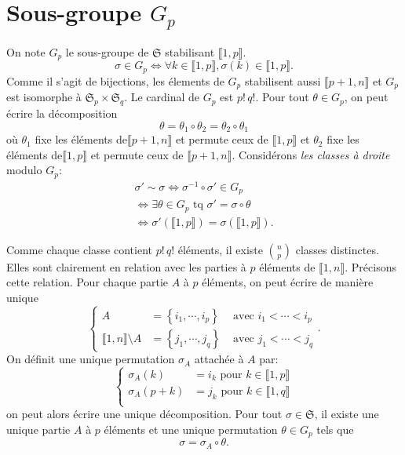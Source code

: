 \section*{Sous-groupe $G_p$}
On note $G_p$ le sous-groupe de $\mathfrak{S}$ stabilisant $\llbracket 1,p \rrbracket$.
\[
 \sigma \in G_p \Leftrightarrow \forall k \in \llbracket 1,p \rrbracket, \sigma(k) \in \llbracket 1,p \rrbracket.
\]
Comme il s'agit de bijections, les élements de $G_p$ stabilisent aussi $\llbracket p+1,n\rrbracket$ et $G_p$ est isomorphe à $\mathfrak{S}_p\times \mathfrak{S}_q$.  Le cardinal de $G_p$ est $p!\, q!$.\newline
Pour tout $\theta \in G_p$, on peut écrire la décomposition
\begin{equation}\label{theta1-2}
 \theta = \theta_1 \circ \theta_2 = \theta_2 \circ \theta_1 
\end{equation}
où $\theta_1$ fixe les éléments de$\llbracket p+1, n\rrbracket$ et permute ceux de $\llbracket 1,p\rrbracket$ et $\theta_2$ fixe les éléments de$\llbracket 1, p\rrbracket$ et permute ceux de $\llbracket p+1,n\rrbracket$.  
Considérons \emph{les classes à droite} modulo $G_p$:
\begin{multline*}
 \sigma' \sim \sigma \Leftrightarrow \sigma^{-1} \circ \sigma' \in G_p \\
 \Leftrightarrow \exists \theta \in G_p \text{ tq } \sigma' = \sigma \circ \theta \\
 \Leftrightarrow \sigma'(\llbracket 1,p \rrbracket) = \sigma(\llbracket 1,p \rrbracket).
\end{multline*}

Comme chaque classe contient $p!\,q!$ éléments, il existe $\binom{n}{p}$ classes distinctes. Elles sont clairement en relation avec les parties à $p$ éléments de $\llbracket 1,n \rrbracket$.\newline
Précisons cette relation. Pour chaque partie $A$ à $p$ éléments, on peut écrire de manière unique
\[
 \left\lbrace 
 \begin{aligned}
  A &= \left\lbrace i_1, \cdots, i_p\right\rbrace &\text{ avec } i_1 < \cdots < i_p \\
  \llbracket 1,n \rrbracket \setminus A &= \left\lbrace j_1, \cdots, j_q\right\rbrace &\text{ avec } j_1 < \cdots < j_q 
 \end{aligned}
 \right. .
\]
On définit une unique permutation $\sigma_A$ attachée à $A$ par:
\[
 \left\lbrace 
 \begin{aligned}
  \sigma_A(k) &= i_k \text{ pour } k\in \llbracket 1,p \rrbracket \\
  \sigma_A(p+k) &= j_k \text{ pour } k\in \llbracket 1,q \rrbracket \\
 \end{aligned}
\right. 
\]
on peut alors écrire une unique décomposition.\newline
Pour tout $\sigma \in \mathfrak{S}$, il existe une unique partie $A$ à $p$ éléments et une unique permutation $\theta \in G_p$ tels que
\[
 \sigma = \sigma_A \circ \theta.
\]

